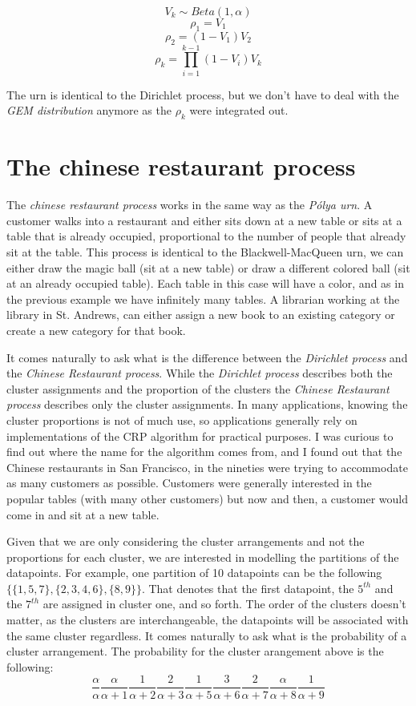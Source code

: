 \documentclass[12pt,a4paper]{article}
\begin{document}
$$ V_{k} \sim Beta(1, \alpha) $$
$$\rho_{1} = V_{1}$$
$$\rho_{2} = (1 - V_{1})V_{2}$$
$$\rho_{k} = \prod_{i=1}^{k-1}(1-V_{i})V_{k}$$

The urn is identical to the Dirichlet process, but we don't have to deal with the \textit{GEM distribution} anymore as the $\rho_{k}$ were integrated out.

\section{The chinese restaurant process}
The \textit{chinese restaurant process} works in the same way as the \textit{Pólya urn}. A customer walks into a restaurant and either sits down at a new table or sits at a table that is already occupied, proportional to the number of people that already sit at the table. This process is identical to the Blackwell-MacQueen urn, we can either draw the magic ball (sit at a new table) or draw a different colored ball (sit at an already occupied table). Each table in this case will have a color, and as in the previous example we have infinitely many tables. A librarian working at the library in St. Andrews, can either assign a new book to an existing category or create a new category for that book. 

It comes naturally to ask what is the difference between the \textit{Dirichlet process} and the \textit{Chinese Restaurant process}. While the \textit{Dirichlet process} describes both the cluster assignments and the proportion of the clusters the \textit{Chinese Restaurant process} describes only the cluster assignments. In many applications, knowing the cluster proportions is not of much use, so applications generally rely on implementations of the CRP algorithm for practical purposes. I was curious to find out where the name for the algorithm comes from, and I found out that the Chinese restaurants in San Francisco, in the nineties were trying to accommodate as many customers as possible. Customers were generally interested in the popular tables (with many other customers) but now and then, a customer would come in and sit at a new table. 

Given that we are only considering the cluster arrangements and not the proportions for each cluster, we are interested in modelling the partitions of the datapoints. For example, one partition of 10 datapoints can be the following $\{\{1, 5, 7\}, \{2,3,4,6\}, \{8, 9\}\}$. That denotes that the first datapoint, the $5^{th}$ and the $7^{th}$ are assigned in cluster one, and so forth. The order of the clusters doesn't matter, as the clusters are interchangeable, the datapoints will be associated with the same cluster regardless. It comes naturally to ask what is the probability of a cluster arrangement. The probability for the cluster arangement above is the following: $$\frac{\alpha}{\alpha}\frac{\alpha}{\alpha+1}\frac{1}{\alpha+2}\frac{2}{\alpha+3}\frac{1}{\alpha+5}\frac{3}{\alpha+6}\frac{2}{\alpha+7}\frac{\alpha}{\alpha+8}\frac{1}{\alpha+9}$$
\end{document}
